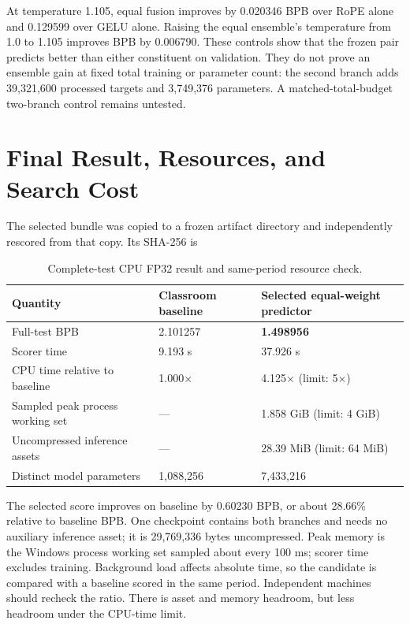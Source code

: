 \documentclass[10pt,a4paper]{article}
\begin{document}
At temperature 1.105, equal fusion improves by 0.020346 BPB over RoPE alone and 0.129599 over GELU alone. Raising the equal ensemble's temperature from 1.0 to 1.105 improves BPB by 0.006790. These controls show that the frozen pair predicts better than either constituent on validation. They do not prove an ensemble gain at fixed total training or parameter count: the second branch adds 39,321,600 processed targets and 3,749,376 parameters. A matched-total-budget two-branch control remains untested.

\section{Final Result, Resources, and Search Cost}\label{sec:cost}
The selected bundle was copied to a frozen artifact directory and independently rescored from that copy. Its SHA-256 is
\begin{center}
\begingroup\small\ttfamily
{}
\endgroup
\end{center}

\begin{table}[t]
\centering\small
\caption{Complete-test CPU FP32 result and same-period resource check.}
\label{tab:resources}
\begin{tabularx}{\textwidth}{@{}Xll@{}}
\toprule
Quantity & Classroom baseline & Selected equal-weight predictor \\
\midrule
Full-test BPB & 2.101257 & \textbf{1.498956} \\
Scorer time & 9.193 s & 37.926 s \\
CPU time relative to baseline & 1.000$\times$ & 4.125$\times$ (limit: 5$\times$) \\
Sampled peak process working set & --- & 1.858 GiB (limit: 4 GiB) \\
Uncompressed inference assets & --- & 28.39 MiB (limit: 64 MiB) \\
Distinct model parameters & 1,088,256 & 7,433,216 \\
\bottomrule
\end{tabularx}
\end{table}

The selected score improves on baseline by 0.60230 BPB, or about 28.66\% relative to baseline BPB. One checkpoint contains both branches and needs no auxiliary inference asset; it is 29,769,336 bytes uncompressed. Peak memory is the Windows process working set sampled about every 100 ms; scorer time excludes training. Background load affects absolute time, so the candidate is compared with a baseline scored in the same period. Independent machines should recheck the ratio. There is asset and memory headroom, but less headroom under the CPU-time limit.
\end{document}
